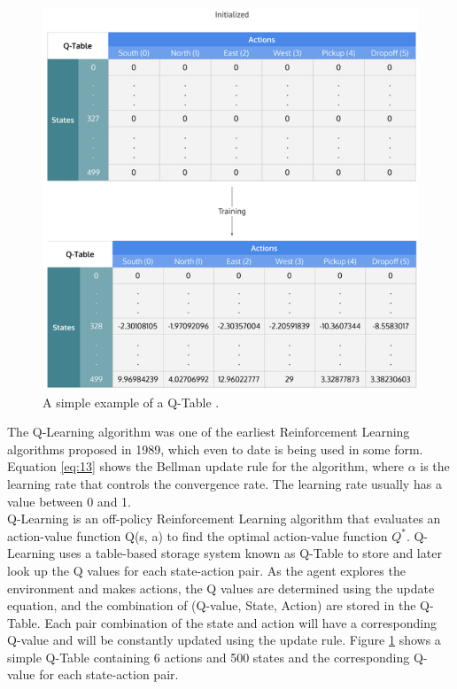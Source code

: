 \begin{figure}[h!]
    \centering
    \includegraphics[width=\textwidth]{images/Q-Table.png}
    \caption{A simple example of a Q-Table \cite{wiki}.}
    \label{fig:QT}
\end{figure}

The Q-Learning algorithm \cite{QL} was one of the earliest Reinforcement Learning algorithms proposed in 1989, which even to date is being used in some form. Equation \ref{eq:13} shows the Bellman update rule for the algorithm, where $\alpha$ is the learning rate that controls the convergence rate. The learning rate usually has a value between 0 and 1. \\

Q-Learning is an off-policy Reinforcement Learning algorithm that evaluates an action-value function Q(s, a) to find the optimal action-value function $Q^{*}$. Q-Learning uses a table-based storage system known as Q-Table to store and later look up the Q values for each state-action pair. As the agent explores the environment and makes actions, the Q values are determined using the update equation, and the combination of (Q-value, State, Action) are stored in the Q-Table. Each pair combination of the state and action will have a corresponding Q-value and will be constantly updated using the update rule. Figure \ref{fig:QT} shows a simple Q-Table containing 6 actions and 500 states and the corresponding Q-value for each state-action pair. \\

